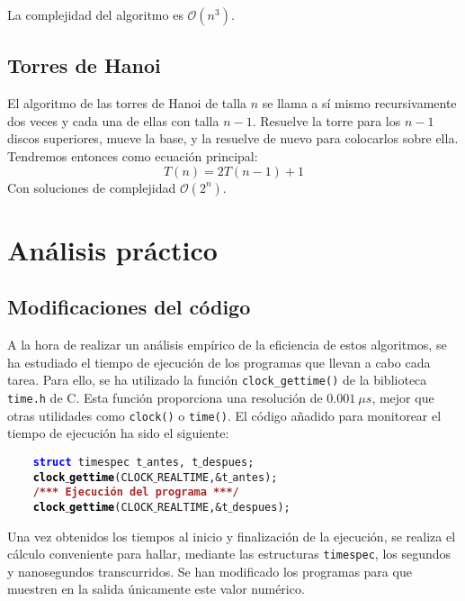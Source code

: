 \documentclass[a4paper, 11pt]{article} %
\begin{document}
La complejidad del algoritmo es $\mathcal{O}(n^3)$.


\subsection{Torres de Hanoi}
El algoritmo de las torres de Hanoi de talla $n$ se llama a sí mismo recursivamente dos veces y cada una de ellas con
talla $n-1$. Resuelve la torre para los $n-1$ discos superiores, mueve la base, y la resuelve de nuevo para colocarlos sobre ella.
Tendremos entonces como ecuación principal:
\begin{equation}
 T(n) = 2T(n-1) + 1
\end{equation}
Con soluciones de complejidad $\mathcal{O}(2^n)$.

\section {Análisis práctico}
\subsection{Modificaciones del código}
A la hora de realizar un análisis empírico de la eficiencia de estos algoritmos, se ha estudiado el tiempo de ejecución de los programas que llevan a cabo cada tarea.
Para ello, se ha utilizado la función \texttt{clock\_gettime()} de la biblioteca \texttt{time.h} de C. Esta función proporciona una resolución de $0.001\ \mu s$, mejor que otras utilidades como \texttt{clock()} o \texttt{time()}.
El código añadido para monitorear el tiempo de ejecución ha sido el siguiente:

\texttt{\mbox{}\ \ \ \ \textbf{\textcolor{Blue}{struct}}\ \textcolor{TealBlue}{timespec}\ t$\_$antes\textcolor{BrickRed}{,}\ t$\_$despues\textcolor{BrickRed}{;} \\
\mbox{}\ \ \ \ \textbf{\textcolor{Black}{clock$\_$gettime}}\textcolor{BrickRed}{(}CLOCK$\_$REALTIME\textcolor{BrickRed}{,\&}t$\_$antes\textcolor{BrickRed}{);} \\
\mbox{}\ \ \ \ \textbf{\textcolor{Brown}{/*** Ejecución del programa ***/}} \\
\mbox{}\ \ \ \ \textbf{\textcolor{Black}{clock$\_$gettime}}\textcolor{BrickRed}{(}CLOCK$\_$REALTIME\textcolor{BrickRed}{,\&}t$\_$despues\textcolor{BrickRed}{);} \\}

Una vez obtenidos los tiempos al inicio y finalización de la ejecución, se realiza el cálculo conveniente para hallar, mediante las estructuras \texttt{timespec}, los segundos y nanosegundos transcurridos. Se han modificado los programas para que muestren en la salida únicamente este valor numérico.
\end{document}
